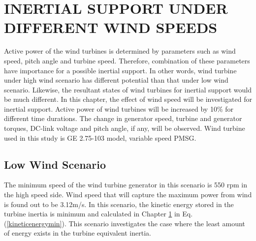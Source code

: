\chapter{INERTIAL SUPPORT UNDER DIFFERENT WIND SPEEDS}
\label{chp:4}
Active power of the wind turbines is determined by parameters such as wind speed, pitch angle and turbine speed. Therefore, combination of these parameters have importance for a possible inertial support. In other words, wind turbine under high wind scenario has different potential than that under low wind scenario. Likewise, the resultant states of wind turbines for inertial support would be much different. In this chapter, the effect of wind speed will be investigated for inertial support. Active power of wind turbines will be increased by 10\% for different time durations. The change in generator speed, turbine and generator torques, DC-link voltage and pitch angle, if any, will be observed. Wind turbine used in this study is GE 2.75-103 model, variable speed PMSG.

\section{Low Wind Scenario}
\label{sec:lowwind}

The minimum speed of the wind turbine generator in this scenario is 550 rpm in the high speed side. Wind speed that will capture the maximum power from wind is found out to be 3.12m/s. In this scenario, the kinetic energy stored in the turbine inertia is minimum and calculated in Chapter \ref{chp:4} in Eq. (\ref{kineticenergymin}). This scenario investigates the case where the least amount of energy exists in the turbine equivalent inertia. 